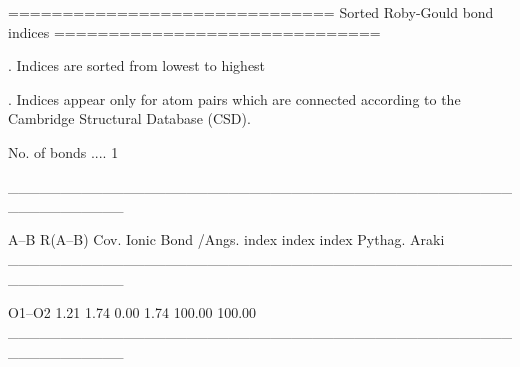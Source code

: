 
==============================
Sorted Roby-Gould bond indices
==============================

. Indices are sorted from lowest to highest

. Indices appear only for atom pairs which are connected
  according to the Cambridge Structural Database (CSD).

No. of bonds .... 1

___________________________________________________________

   A--B     R(A--B)    Cov.   Ionic   Bond    %
             /Angs.   index   index  index  Pythag.   Araki
___________________________________________________________

  O1--O2       1.21    1.74    0.00   1.74   100.00  100.00
___________________________________________________________
